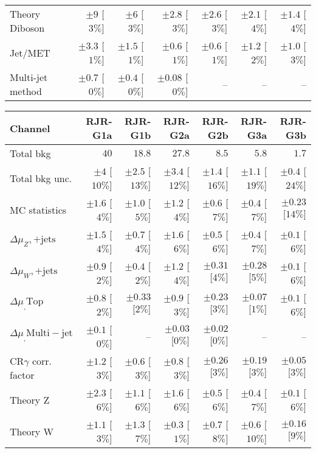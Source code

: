 \begin{table}[H]
\begin{center}
\begin{tabular}{|lrrrrrr|}
Theory Diboson  &  $\pm 9$ [$3\%$]  &  $\pm 6$ [$3\%$]  &  $\pm 2.8$ [$3\%$]  &  $\pm 2.6$ [$3\%$]  &  $\pm 2.1$ [$4\%$]  &  $\pm 1.4$ [$4\%$] \\
Jet/MET   &  $\pm 3.3$ [$1\%$]  &  $\pm 1.5$ [$1\%$]  &  $\pm 0.6$ [$1\%$]  &  $\pm 0.6$ [$1\%$]  &  $\pm 1.2$ [$2\%$]  &  $\pm 1.0$ [$3\%$] \\
Multi-jet method  &  $\pm 0.7$ [$0\%$]  &  $\pm 0.4$ [$0\%$]  &  $\pm 0.08$ [$0\%$]  &   --    &   --    &   --   \\
\hline
\end{tabular}

\begin{tabular}{|lrrrrrr|}
\hline
Channel  &  \textbf{ RJR-G1a } & \textbf{ RJR-G1b } & \textbf{ RJR-G2a } & \textbf{ RJR-G2b } & \textbf{ RJR-G3a } & \textbf{ RJR-G3b }  \\ \hline
Total bkg  &  $40$  &  $18.8$  &  $27.8$  &  $8.5$  &  $5.8$  &  $1.7$ \\
Total bkg unc.  &  $\pm 4$  [$10\%$]  &  $\pm 2.5$  [$13\%$]  &  $\pm 3.4$  [$12\%$]  &  $\pm 1.4$  [$16\%$]  &  $\pm 1.1$  [$19\%$]  &  $\pm 0.4$  [$24\%$] \\
\hline
MC statistics  &  $\pm 1.6$ [$4\%$]  &  $\pm 1.0$ [$5\%$]  &  $\pm 1.2$ [$4\%$]  &  $\pm 0.6$ [$7\%$]  &  $\pm 0.4$ [$7\%$]  &  $\pm 0.23$ [$14\%$] \\
$\Delta\mu_Z,\mathrm{+jets}$  &  $\pm 1.5$ [$4\%$]  &  $\pm 0.7$ [$4\%$]  &  $\pm 1.6$ [$6\%$]  &  $\pm 0.5$ [$6\%$]  &  $\pm 0.4$ [$7\%$]  &  $\pm 0.1$ [$6\%$] \\
$\Delta\mu_W,\mathrm{+jets}$  &  $\pm 0.9$ [$2\%$]  &  $\pm 0.4$ [$2\%$]  &  $\pm 1.2$ [$4\%$]  &  $\pm 0.31$ [$4\%$]  &  $\pm 0.28$ [$5\%$]  &  $\pm 0.1$ [$6\%$] \\
$\Delta\mu_,\mathrm{ Top}$  &  $\pm 0.8$ [$2\%$]  &  $\pm 0.33$ [$2\%$]  &  $\pm 0.9$ [$3\%$]  &  $\pm 0.23$ [$3\%$]  &  $\pm 0.07$ [$1\%$]  &  $\pm 0.1$ [$6\%$] \\
$\Delta\mu_,\mathrm{ Multi-jet}$  &  $\pm 0.1$ [$0\%$]  &  --  &  $\pm 0.03$ [$0\%$]  &  $\pm 0.02$ [$0\%$]  &   --    &   --   \\
CR$\gamma$ corr. factor  &  $\pm 1.2$ [$3\%$]  &  $\pm 0.6$ [$3\%$]  &  $\pm 0.8$ [$3\%$]  &  $\pm 0.26$ [$3\%$]  &  $\pm 0.19$ [$3\%$]  &  $\pm 0.05$ [$3\%$] \\
Theory Z  &  $\pm 2.3$ [$6\%$]  &  $\pm 1.1$ [$6\%$]  &  $\pm 1.6$ [$6\%$]  &  $\pm 0.5$ [$6\%$]  &  $\pm 0.4$ [$7\%$]  &  $\pm 0.1$ [$6\%$] \\
Theory W  &  $\pm 1.1$ [$3\%$]  &  $\pm 1.3$ [$7\%$]  &  $\pm 0.3$ [$1\%$]  &  $\pm 0.7$ [$8\%$]  &  $\pm 0.6$ [$10\%$]  &  $\pm 0.16$ [$9\%$] \\

\end{tabular}
\end{center}
\end{table}
